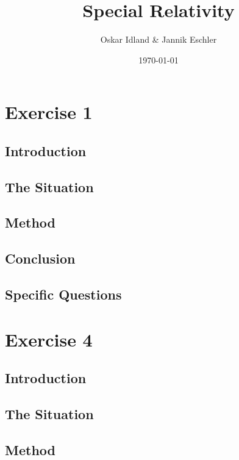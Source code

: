 \documentclass[reprint,english,notitlepage]{revtex4-2}
\begin{document}
\title{Special Relativity}
\author{Oskar Idland \& Jannik Eschler}
\date{\today}


\maketitle

\section{Exercise 1}

  \subsection{Introduction}

  \subsection{The Situation}

  \subsection{Method}

  \subsection{Conclusion} 

  \subsection{Specific Questions}


\section{Exercise 4}

  \subsection{Introduction}

  \subsection{The Situation}

  \subsection{Method}
\end{document}
